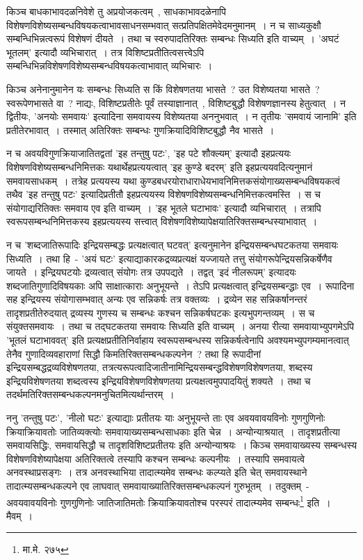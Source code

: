 		किञ्च बाधकाभावदळनिवेशे तु अप्रयोजकत्वम्~, साधकाभावदळेनापि विशेषणविशेष्यसम्बन्धविषयकत्वाभावसाधनसम्भवात् सत्प्रतिपक्षितमेवेदमनुमानम्~। न च साध्यकुक्षौ सम्बन्धिभिन्नत्वरूपं विशेषणं दीयते~। तथा च स्वरुपादतिरिक्तः सम्बन्धः सिध्यति इति वाच्यम्~। 'अघटं भूतलम्' इत्यादौ व्यभिचारात्~। तत्र विशिष्टप्रतीतित्वसत्त्वेऽपि सम्बन्धिभिन्नविशेषणविशेष्यसम्बन्धविषयकत्वाभावात् व्यभिचारः~।

		किञ्च अनेनानुमानेन यः सम्बन्धः सिध्यति स किं विशेषणतया भासते~? उत विशेष्यतया भासते~? स्वरूपेणभासते वा~? नाद्यः, विशिष्टप्रतीतेः पूर्वं तस्याज्ञानात्~, विशिष्टबुद्धौ विशेषणज्ञानस्य हेतुत्वात्~। न द्वितीयः, 'अनयोः समवायः' इत्यादिना समवायस्य विशेष्यतया अननुभवात्~। न तृतीयः 'समवायं जानामि' इति प्रतीतेरभावात्~। तस्मात् अतिरिक्तः सम्बन्धः गुणक्रियादिविशिष्टबुद्धौ नैव भासते~। 

		न च अवयविगुणक्रियाजातितद्वतां 'इह तन्तुषु पटः', 'इह पटे शौक्ल्यम्' इत्यादौ इहप्रत्ययः विशेषणविशेष्यसम्बन्धनिमित्तकः यथार्थेहप्रत्ययत्वात् 'इह कुण्डे बदरम्' इति इहप्रत्ययवदित्यनुमानं समवायसाधकम्~। तत्रेह प्रत्ययस्य यथा कुण्डबधरयोराधाराधेयभावनिमित्तकसंयोगाख्यसम्बन्धविषयकत्वं तथैव 'इह तन्तुषु पटः' इत्यादिप्रतीतौ इहप्रत्ययस्य विशेषणविशेष्यसम्बन्धनिमित्तकत्वमस्ति~। स च संयोगाद्यरितिक्तः समवाय एव इति वाच्यम्~। 'इह भूतले घटाभावः' इत्यादौ व्यभिचारात्~। तत्रापि स्वरूपसम्बन्धनिमित्तकस्य इहप्रत्ययस्य सत्त्वात् विशेषणविशेष्यापेक्षयातिरिक्तसम्बन्धस्याभावात्~। 

		न च 'शब्दजातिरूपादिः इन्द्रियसम्बद्धः प्रत्यक्षत्वात् घटवत्'  इत्यनुमानेन इन्द्रियसम्बन्धघटकतया समवायः सिध्यति~। तथा हि~- 'अयं घटः' इत्याद्याकारकद्रव्यप्रत्यक्षं यज्जायते तत्तु संयोगरूपेन्द्रियसन्निकर्षेणैव जायते~। इन्द्रियघटयोः द्रव्यत्वात् संयोगः तत्र उपपद्यते~। तद्वत् 'इदं नीलरूपम्' इत्यादयः शब्दजातिगुणादिविषयकाः अपि साक्षात्काराः अनुभूयन्ते~। तेऽपि प्रत्यक्षत्वात् इन्द्रियसम्बन्द्धाः एव~। रूपादिना सह इन्द्रियस्य संयोगासम्भवात् अन्यः एव सन्निकर्षः तत्र वक्तव्यः~। द्रव्येन सह सन्निकर्षानन्तरं तादृशप्रतीतेरुदयात् द्रव्यस्य गुणस्य च सम्बन्धः कश्चन सन्निकर्षघटकः इत्यभुपगन्तव्यम्~। स च संयुक्तसमवायः~। तथा च तद्घटकतया समवायः सिध्यति इति वाच्यम्~। अनया रीत्या समवायाभ्युपगमेऽपि 'भूतलं घटाभाववत्' इति प्रत्यक्षप्रतीतिनिर्वाहाय स्वरूपसम्बन्धस्य सन्निकर्षत्वेनापि अवश्यमभ्युपगम्यमानत्वात् तेनैव गुणादिव्यवहाराणां सिद्धौ किमतिरिक्तसम्बन्धकल्पनेन~? तथा हि रूपादीनां इन्द्रियसम्बद्धद्रव्यविशेषणतया, तत्रत्यरूपत्वादिजातीनामिन्द्रियसम्बन्द्धविशेषणविशेषणतया, शब्दस्य इन्द्रियविशेषणतया शब्दत्वस्य इन्द्रियविशेषणविशेषणतया प्रत्यक्षत्वमुपपादयितुं शक्यते~। तथा च तदर्थमतिरिक्तसम्बन्धकल्पनमनुचितमित्यर्थान्तरम्~।

		ननु 'तन्तुषु पटः', 'नीलो घटः' इत्याद्याः प्रतीतयः याः अनुभूयन्ते ताः एव अवयवावयविनोः‌ गुणगुणिनोः क्रियाक्रियावतोः जातिव्यक्त्योः समवायाख्यसम्बन्धसाधकाः इति चेन्न~। अन्योन्याश्रयात्~। तादृशप्रतीत्या समवायसिद्धिः, समवायसिद्धौ च तादृशविशिष्टप्रतीतयः इति अन्योन्याश्रयः~। किञ्च समवायाख्यस्य सम्बन्धस्य विशेषणविशेष्यापेक्षया अतिरिक्तत्वे तस्यापि कश्चन सम्बन्धः कल्पनीयः~। तस्यापि समवायत्वे अनवस्थाप्रसङ्गः~। तत्र अनवस्थाभिया तादात्म्यमेव सम्बन्धः कल्प्यते इति चेत् समवायस्थाने तादात्म्यसम्बन्धकल्पने एव लाघवात् समवायाख्यातिरिक्तसम्बन्धकल्पनं गुरुभूतम्~। तदुक्तम्~- {\fontsize{11.7}{0}\selectfont\s अवयवावयविनोः गुणगुणिनोः जातिजातिमतोः क्रियाक्रियावतोश्च परस्परं तादात्म्यमेव सम्बन्धः\footnote{मा.मे. २७५}} इति~। मैवम्~।

